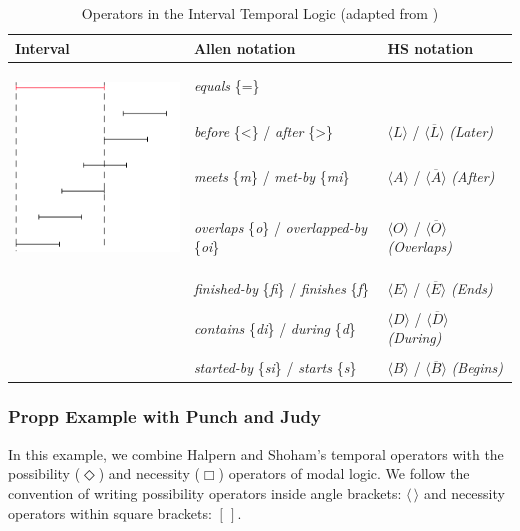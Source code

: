 \documentclass[11pt]{report}
\begin{document}
\begin{table}[!t]
  \centering
  \caption{Operators in the Interval Temporal Logic (adapted from \citet{della2013interval})}
  \label{tab:itl}
  \begin{tabular}{l|l|l}
    {\bf Interval} & {\bf Allen notation} & {\bf HS notation} \\
    \hline& &\\
    \multirow{7}{*}{\includegraphics[height=2.02in]{intervals.png}}&\emph{equals} \{=\} &\\
    & &\\
                   &\emph{before} \{\textless\} / \emph{after} \{\textgreater\} & $\langle L \rangle$ / $\langle \overline{L} \rangle$ \emph{(Later)}\\
    & &\\
                   &\emph{meets} \{\emph{m}\} / \emph{met-by} \{\emph{mi}\} &$\langle A \rangle$ / $\langle \overline{A} \rangle$ \emph{(After)}\\
    & &\\
    &\emph{overlaps} \{\emph{o}\} / \emph{overlapped-by} \{\emph{oi}\} &$\langle O \rangle$ / $\langle \overline{O} \rangle$ \emph{(Overlaps)}\\
    & &\\
    &\emph{finished-by} \{\emph{fi}\} / \emph{finishes} \{\emph{f}\} &$\langle E \rangle$ / $\langle \overline{E} \rangle$ \emph{(Ends)}\\
    & &\\
    &\emph{contains} \{\emph{di}\} / \emph{during} \{\emph{d}\} &$\langle D \rangle$ / $\langle \overline{D} \rangle$ \emph{(During)}\\
    & &\\
    &\emph{started-by} \{\emph{si}\} / \emph{starts} \{\emph{s}\} &$\langle B \rangle$ / $\langle \overline{B} \rangle$ \emph{(Begins)}
  \end{tabular}
\end{table}
\subsubsection{Propp Example with Punch and Judy}
In this example, we combine Halpern and Shoham's temporal operators with the possibility ($\Diamond$) and necessity ($\Box$) operators of modal logic. We follow the convention of writing possibility operators inside angle brackets: $\langle \, \rangle$ and necessity operators within square brackets: $[ \, ]$.
\end{document}
